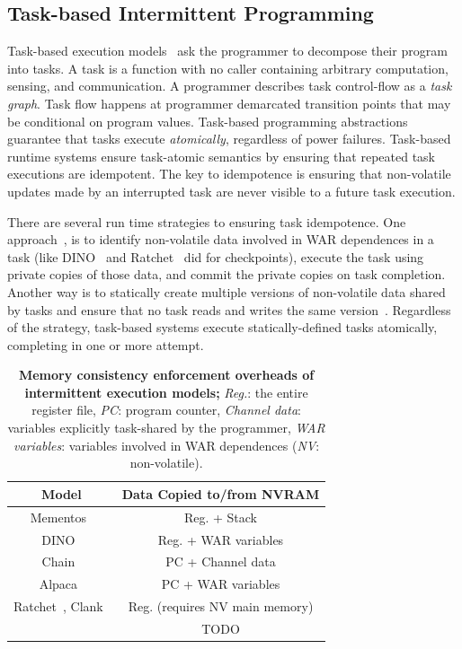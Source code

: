 \subsection{Task-based Intermittent Programming}
\label{section:background_task_computing}


Task-based execution models~\cite{dino,chain,alpaca} ask the programmer to decompose their program into tasks. A task is a function with no caller containing arbitrary computation, sensing, and communication. A programmer describes task control-flow as a {\em task graph}. Task flow happens at programmer demarcated transition points that may be conditional on program values. Task-based programming abstractions guarantee that tasks execute {\em atomically}, regardless of power failures. Task-based runtime systems ensure task-atomic semantics by ensuring that repeated task executions are idempotent. The key to idempotence is ensuring that non-volatile updates made by an interrupted task are never visible to a future task execution.  

There are several run time strategies to ensuring task idempotence. One approach~\cite{alpaca}, is to identify non-volatile data involved in WAR dependences in a task (like DINO~\cite{dino} and Ratchet~\cite{ratchet} did for checkpoints), execute the task using private copies of those data, and commit the private copies on task completion. Another way is to statically create multiple versions of non-volatile data shared by tasks and ensure that no task reads and writes the same version~\cite{chain}. Regardless of the strategy, task-based systems execute statically-defined tasks atomically, completing in one or more attempt. 

\begin{table}
	\centering
	\footnotesize
	\begin{tabular}{|c|c|}
		\hline
		Model & Data Copied to/from NVRAM \\
		\hline\hline
		Mementos~\cite{mementos}                             & Reg. + Stack     \\
		DINO~\cite{dino}                                     & Reg. + WAR variables \\
		Chain~\cite{chain}                                   & PC   + Channel data\\
		Alpaca~\cite{alpaca}                                 & PC   + WAR variables \\
		Ratchet~\cite{ratchet}, Clank~\cite{hicks_isca_2017} & Reg. (requires NV main memory) \\
        \cite{intel} & TODO \\ 
		\hline
	\end{tabular}
	\caption{\textbf{Memory consistency enforcement overheads of intermittent execution models;} \emph{Reg.}: the entire register file, \emph{PC}: program counter, \emph{Channel data}: variables explicitly task-shared by the programmer, \emph{WAR variables}: variables involved in WAR dependences (\emph{NV}: non-volatile).}
	\label{table:chechpoint_comparison}
\end{table}

